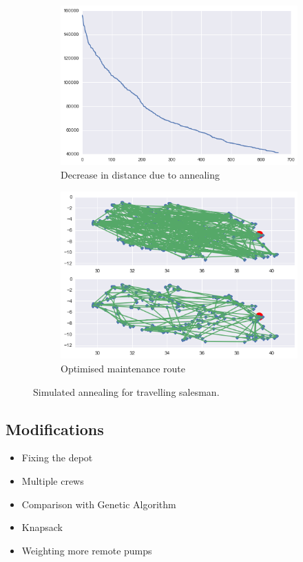 \documentclass{article} %
\begin{document}
\begin{multicols}{2}
\begin{figure}
	\begin{subfigure}{0.5\textwidth}
		\includegraphics[width=\textwidth]{figures/Plain-TSP-Trace}
		\caption{Decrease in distance due to annealing}
		\label{fig:Plain-TSP-Trace}
	\end{subfigure}
	\begin{subfigure}{0.5\textwidth}
		\includegraphics[width=\textwidth]{figures/Optimised-Route}
		\caption{Optimised maintenance route}
		\label{fig:trace_comp}
	\end{subfigure}
	\caption{Simulated annealing for travelling salesman.}
	\label{fig:TSP}
\end{figure}

\subsection{Modifications}
\begin{itemize}
  \item Fixing the depot
  \item Multiple crews
  \item Comparison with Genetic Algorithm
  \item Knapsack
  \item Weighting more remote pumps
\end{itemize}


\end{multicols}
\end{document}
